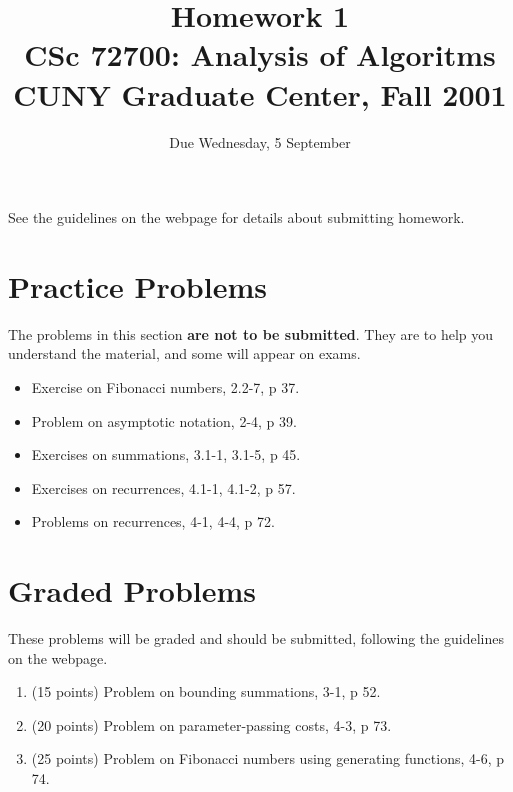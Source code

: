 \documentclass[11pt]{article}
\begin{document}
\title{Homework 1\\
       CSc 72700: Analysis of Algoritms\\
       CUNY Graduate Center, Fall 2001 }
\date{Due Wednesday, 5 September}
\author{}
\maketitle

See the guidelines on the webpage for details about submitting homework.

\section*{Practice Problems}

The problems in this section {\bf are not to be submitted}.  They are to
help you understand the material, and some will appear on exams.

\begin{itemize}
    \item Exercise on Fibonacci numbers, 2.2-7, p 37.
    \item Problem on asymptotic notation, 2-4, p 39.
    \item Exercises on summations, 3.1-1, 3.1-5, p 45.
    \item Exercises on recurrences, 4.1-1, 4.1-2, p 57.
    \item Problems on recurrences, 4-1, 4-4, p 72.
    
\end{itemize}

\section*{Graded Problems}

These problems will be graded and should be submitted, following the
guidelines on the webpage.

\begin{enumerate}
    \item (15 points) Problem on bounding summations, 3-1, p 52.
    \item (20 points) Problem on parameter-passing costs, 4-3, p 73.
    \item (25 points) Problem on Fibonacci numbers using generating 
	functions, 4-6, p 74.
\end{enumerate}
\end{document}
